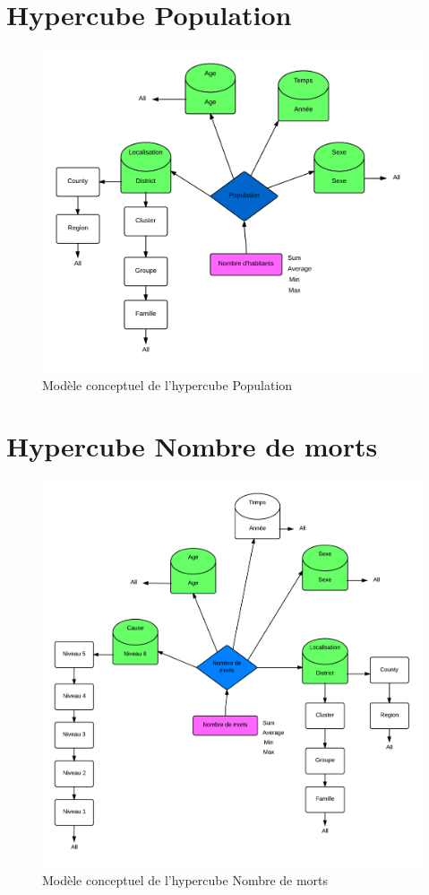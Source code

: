 \section{Hypercube Population}
\begin{figure}[h!]
    \centering
    \includegraphics[width=\linewidth]{images/pop/cube.png}
    \caption{Modèle conceptuel de l'hypercube Population}
    \label{conception_cube_pop}
\end{figure}

\section{Hypercube Nombre de morts}
\begin{figure}[h!]
    \centering
    \includegraphics[width=\linewidth]{images/cubeNbMorts.png}
    \caption{Modèle conceptuel de l'hypercube Nombre de morts}
    \label{conception_cube_nombre_morts}
\end{figure}


